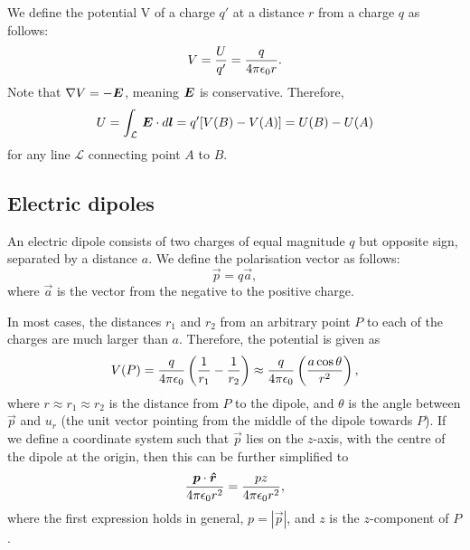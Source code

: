     
    We define the potential V of a charge $q'$ at a distance $r$ from a charge $q$ as follows: 
    \begin{equation}
        V = \frac{U}{q'} = \frac{q}{4\pi\epsilon_0 r}.
    \end{equation}
    Note that $\nabla V = -\bm{E}$, meaning $\bm{E}$ is conservative. Therefore, 
    \begin{equation}
        U = \int_\mathcal{L}\,\bm{E}\cdot d\bm{l} = q'[V(B) - V(A)] = U(B) - U(A)
    \end{equation}
    for any line $\mathcal{L}$ connecting point $A$ to $B$.

\subsection{Electric dipoles}
    An electric dipole consists of two charges of equal magnitude $q$ but opposite sign, separated by a distance $a$. 
    We define the polarisation vector as follows: 
    \begin{equation}
        \vec{p} = q\vec{a},
    \end{equation}
    where $\vec{a}$ is the vector from the negative  to the positive charge. 
    
    In most cases, the distances $r_1$ and $r_2$ from an arbitrary point $P$ to each of the charges are much larger than $a$. 
    Therefore, the potential is given as 
    \begin{equation}
        V(P) = \frac{q}{4\pi\epsilon_0}\left( \frac{1}{r_1}-\frac{1}{r_2}\right) \approx 
        \frac{q}{4\pi\epsilon_0}\left(\frac{a\cos\theta}{r^2}\right),
    \end{equation}
    where $r \approx r_1 \approx r_2$ is the distance from $P$ to the dipole, and $\theta$ is the angle between $\vec{p}$ and $u_r$ 
    (the unit vector pointing from the middle of the dipole towards $P$). 
    If we define a coordinate system such that $\vec{p}$ lies on the $z$-axis, 
    with the centre of the dipole at the origin, then this can be further simplified to
    \begin{equation}
        \frac{\vec{p}\cdot \hat{r}}{4\pi\e r^2} = \frac{pz}{4\pi\e r^2},
    \end{equation}
    where the first expression holds in general, $p = |\vec{p}|$, and $z$ is the $z$-component of $P$.
    
